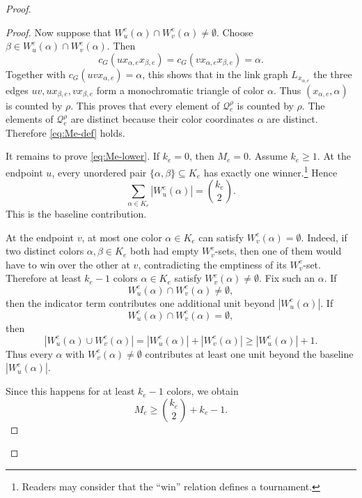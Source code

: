 \documentclass[10pt,a4paper]{amsart}
\begin{document}
\begin{proof}
\begin{proof}
        Now suppose that $W_u^e(\alpha)\cap W_v^e(\alpha)\neq\emptyset$.
        Choose $\beta\in W_u^e(\alpha)\cap W_v^e(\alpha)$.  Then
        \[
            c_G(ux_{\alpha,e}x_{\beta,e})
            =
            c_G(vx_{\alpha,e}x_{\beta,e})
            =
            \alpha.
        \]
        Together with $c_G(uvx_{\alpha,e})=\alpha$,
        this shows that in the link graph $L_{x_{\alpha,e}}$ the three edges $uv, ux_{\beta,e}, vx_{\beta,e}$ form a monochromatic triangle of color $\alpha$.
        Thus $(x_{\alpha,e},\alpha)$ is counted by $\rho$.
        This proves that every element of $\mathcal Q_e^\rho$ is counted by $\rho$.
        The elements of $\mathcal Q_e^\rho$ are distinct because their color coordinates
        $\alpha$ are distinct.  Therefore \eqref{eq:Me-def} holds.

        It remains to prove \eqref{eq:Me-lower}.  If $k_e=0$, then
        $M_e=0$.
        Assume $k_e\ge1$. At the endpoint $u$, every unordered pair
        $\{\alpha,\beta\}\subseteq K_e$ has exactly one winner.\footnote{Readers may consider that the ``win'' relation defines a tournament.}  Hence
        \[
            \sum_{\alpha\in K_e}|W_u^e(\alpha)|
            =
            \binom{k_e}{2}.
        \]
        This is the baseline contribution.

        At the endpoint $v$, at most one color $\alpha\in K_e$ can satisfy
        $W_v^e(\alpha)=\emptyset$.  Indeed, if two distinct colors
        $\alpha,\beta\in K_e$ both had empty $W_v^e$-sets, then one of them
        would have to win over the other at $v$, contradicting the emptiness
        of its $W_v^e$-set.  Therefore at least $k_e-1$ colors
        $\alpha\in K_e$ satisfy $W_v^e(\alpha)\neq\emptyset$.
        Fix such an $\alpha$.  If
        \[
            W_u^e(\alpha)\cap W_v^e(\alpha)\neq\emptyset,
        \]
        then the indicator term contributes one additional unit beyond
        $|W_u^e(\alpha)|$.  If
        \[
            W_u^e(\alpha)\cap W_v^e(\alpha)=\emptyset,
        \]
        then
        \[
            |W_u^e(\alpha)\cup W_v^e(\alpha)|
            =
            |W_u^e(\alpha)|+|W_v^e(\alpha)|
            \ge |W_u^e(\alpha)|+1.
        \]
        Thus every $\alpha$ with $W_v^e(\alpha)\neq\emptyset$ contributes at
        least one unit beyond the baseline $|W_u^e(\alpha)|$.

        Since this happens for at least $k_e-1$ colors, we obtain
        \[
            M_e
            \ge
            \binom{k_e}{2}+k_e-1.
        \]
    \end{proof}


\end{proof}
\end{document}
